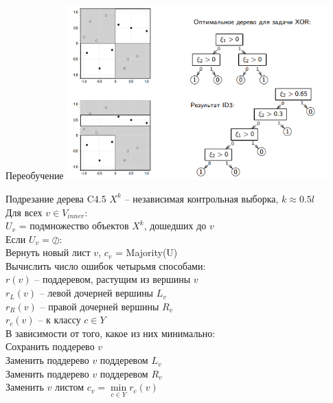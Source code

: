 \documentclass[10pt]{beamer}
\begin{document}
\begin{frame}{Переобучение}
  \includegraphics[height=190pt, keepaspectratio = true]{images/overfitting}   
\end{frame}

{
\begin{frame}{Подрезание дерева C4.5}
  $X^k$ -- независимая контрольная выборка, $k \approx 0.5l$\\
	Для всех $v \in V_{inner}$:\\
		\hspace{10mm} $U_v$ = подмножество объектов $X^k$, дошедших до $v$\\
		\hspace{10mm} Если $U_v = \oslash$:\\
		  \hspace{20mm} Вернуть новый лист $v$, $c_v$ = Majority(U)\\
		\hspace{10mm} Вычислить число ошибок четырьмя способами:\\
			\hspace{20mm} $r(v)$ -- поддеревом, растущим из вершины $v$\\
			\hspace{20mm} $r_L(v)$ -- левой дочерней вершины $L_v$\\
			\hspace{20mm} $r_R(v)$ -- правой дочерней вершины $R_v$\\
			\hspace{20mm} $r_c(v)$ -- к классу $c \in Y$\\
		\hspace{10mm} В зависимости от того, какое из них минимально:\\
			\hspace{20mm} Сохранить поддерево $v$\\
			\hspace{20mm} Заменить поддерево $v$ поддеревом $L_v$\\
			\hspace{20mm} Заменить поддерево $v$ поддеревом $R_v$\\
			\hspace{20mm} Заменить $v$ листом $c_v = \min\limits_{c \in Y} r_c(v)$\\
\end{frame}
}
\end{document}
